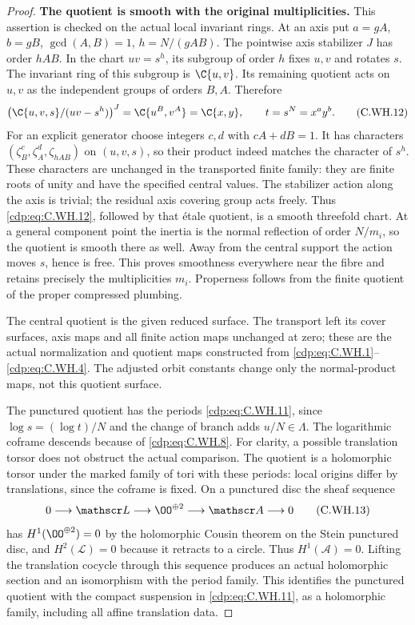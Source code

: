 \begin{proof}
\par\medskip\noindent\textbf{The quotient is smooth with the original multiplicities.}
This assertion is checked on the
actual local invariant rings.
At an axis put $a=gA$, $b=gB$,
$\gcd(A,B)=1$, $h=N/(gAB)$.
The pointwise axis stabilizer
$J$ has order $hAB$. In the chart
$uv=s^h$, its subgroup of order
$h$ fixes $u,v$ and rotates $s$.
The invariant ring of this
subgroup is $\C\{u,v\}$.
Its remaining quotient acts on
$u,v$ as the independent groups
of orders $B,A$. Therefore
\[
 \bigl(\C\{u,v,s\}/(uv-s^h)\bigr)^J
           =\C\{u^B,v^A\}=\C\{x,y\},
 \qquad t=s^N=x^a y^b .
\tag{C.WH.12}\label{cdp:eq:C.WH.12}
\]
For an explicit generator choose
integers $c,d$ with $cA+dB=1$.
It has characters
$(\zeta_B^c,\zeta_A^d,\zeta_{hAB})$
on $(u,v,s)$, so their product
indeed matches the character of
$s^h$. These characters are
unchanged in the transported
finite family: they are finite
roots of unity and have the
specified central values.
The stabilizer action along the
axis is trivial; the residual
axis covering group acts freely.
Thus \eqref{cdp:eq:C.WH.12}, followed by that
\'{e}tale quotient, is a smooth
threefold chart. At a general
component point the inertia is
the normal reflection of order
$N/m_i$, so the quotient is
smooth there as well. Away from
the central support the action
moves $s$, hence is free.
This proves smoothness everywhere
near the fibre and retains
precisely the multiplicities
$m_i$. Properness follows from
the finite quotient of the
proper compressed plumbing.

The central quotient is the
given reduced surface. The
transport left its cover surfaces,
axis maps and all finite action
maps unchanged at zero; these
are the actual normalization
and quotient maps constructed
from \eqref{cdp:eq:C.WH.1}--\eqref{cdp:eq:C.WH.4}.
The adjusted orbit constants
change only the normal-product
maps, not this quotient surface.

The punctured quotient has the
periods \eqref{cdp:eq:C.WH.11}, since
$\log s=(\log t)/N$ and the
change of branch adds $u/N\in\Lambda$.
The logarithmic coframe descends
because of \eqref{cdp:eq:C.WH.8}.
For clarity, a possible translation
torsor does not obstruct the
actual comparison. The quotient
is a holomorphic torsor under
the marked family of tori with
these periods: local origins
differ by translations, since
the coframe is fixed. On a
punctured disc the sheaf sequence
\[
 0\longrightarrow\mathscr L
   \longrightarrow\OO^{\oplus2}
   \longrightarrow\mathscr A
   \longrightarrow0
\tag{C.WH.13}\label{cdp:eq:C.WH.13}
\]
has $H^1(\OO^{\oplus2})=0$ by
the holomorphic Cousin theorem
on the Stein punctured disc,
and $H^2(\mathscr L)=0$ because
it retracts to a circle.
Thus $H^1(\mathscr A)=0$.
Lifting the translation cocycle
through this sequence produces
an actual holomorphic section
and an isomorphism with the
period family. This identifies
the punctured quotient with
the compact suspension in
\eqref{cdp:eq:C.WH.11}, as a holomorphic
family, including all affine
translation data.


\end{proof}
